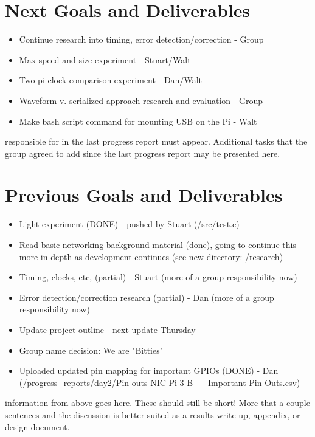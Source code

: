 \documentclass{article}
\begin{document}
\section*{Next Goals and Deliverables}
\begin{itemize}
\item Continue research into timing, error detection/correction - Group
\item Max speed and size experiment - Stuart/Walt
\item Two pi clock comparison experiment - Dan/Walt
\item Waveform v. serialized approach research and evaluation - Group
\item Make bash script command for mounting USB on the Pi - Walt
\end{itemize}

responsible for in the last progress report must appear. Additional tasks that the
group agreed to add since the last progress report may be presented here.
\section*{Previous Goals and Deliverables}
\begin{itemize}
    \item Light experiment (DONE) - pushed by Stuart (/src/test.c)
    \item Read basic networking background material (done), going to continue this more in-depth as development continues (see new directory: /research)
    \item Timing, clocks, etc, (partial) - Stuart (more of a group responsibility now) 
    \item Error detection/correction research (partial) - Dan (more of a group responsibility now)
    \item Update project outline - next update Thursday
    \item Group name decision: We are "Bitties"
    \item Uploaded updated pin mapping for important GPIOs (DONE) - Dan (/progress_reports/day2/Pin outs NIC-Pi 3 B+ - Important Pin Outs.csv)
\end{itemize}

information from above goes here. These should still be short! More that a couple
sentences and the discussion is better suited as a results write-up, appendix, or
design document.
\end{document}
